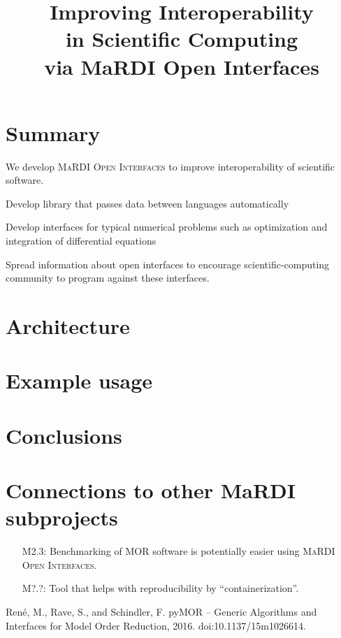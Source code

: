\documentclass{mmposter}
\title{Improving Interoperability\\in Scientific Computing\\via MaRDI Open Interfaces}
\newcommand{\OIF}{\textsc{MaRDI Open Interfaces}\xspace}
\begin{document}


\maketitle

\section*{Summary}
We develop \OIF{} to improve interoperability of scientific software.

\begin{objectives}
  \item Develop library that passes data between languages automatically
  \item Develop interfaces for typical numerical problems
  such as optimization and integration of differential equations
  \item Spread information about open interfaces to encourage
  scientific-computing community to program against these interfaces.
\end{objectives}

\section*{Architecture}
\lipsum[1]

\newpage

\section*{Example usage}
\lipsum[2]

\section*{Conclusions}
\lipsum[3]

\section*{Connections to other MaRDI subprojects}

\begin{itemize}[align=left]
  \item[\color{CEmphasis1}M2.3:] Benchmarking of MOR software is potentially
    easier using \OIF{}.
  \item[\color{CEmphasis1}M?.?:] Tool that helps with reproducibility
    by ``containerization''.
\end{itemize}

\begin{thebibliography}{1}
  \setlength{\itemsep}{1pt}
  \setlength{\parskip}{1.5pt}

  \scriptsize{

  Ren{\'{e}}, M., Rave, S., and Schindler, F.
  \newblock pyMOR -- Generic Algorithms and Interfaces for Model Order Reduction, 2016.
  \newblock doi:10.1137/15m1026614.
  }
\end{thebibliography}
\end{document}
